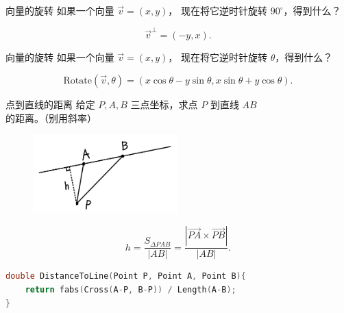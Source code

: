 \documentclass{beamer}
\begin{document}
\begin{frame}[fragile]{向量的旋转}
    如果一个向量 $\overrightarrow{v}=(x,y)$，
    现在将它逆时针旋转 $90^\circ$，得到什么？

    \vspace{1em}\pause
    \begin{equation}
        \overrightarrow{v}^\perp=(-y,x).
    \end{equation}

\end{frame}

\begin{frame}[fragile]{向量的旋转}
    如果一个向量 $\overrightarrow{v}=(x,y)$，
    现在将它逆时针旋转 $\theta$，得到什么？

    \vspace{1em}\pause
    \begin{equation}
        \text{Rotate}(\overrightarrow{v},\theta)=(x\cos\theta-y\sin\theta,x\sin\theta+y\cos\theta).
    \end{equation}

\end{frame}

\begin{frame}[fragile]{点到直线的距离}
    \footnotesize
    给定 $P,A,B$ 三点坐标，求点 $P$ 到直线 $AB$ 的距离。（别用斜率）

    \vspace{1em}\pause
    \begin{figure}[H]
        \centering
        \includegraphics[width=0.5\textwidth]{pic/ptl.jpg}
    \end{figure}
    \begin{equation}
        h=\frac{S_{\Delta PAB}}{|AB|}=\frac{|\overrightarrow{PA}\times \overrightarrow{PB}|}{|AB|}.
    \end{equation}

    \vspace{1em}\pause
    \begin{lstlisting}[language=c++]
double DistanceToLine(Point P, Point A, Point B){
    return fabs(Cross(A-P, B-P)) / Length(A-B);
}
    \end{lstlisting}
\end{frame}
\end{document}
